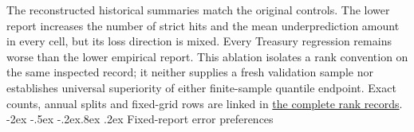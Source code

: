\documentclass[10pt,a4paper]{article}
\makeatletter
\renewcommand\section{\@startsection{section}{1}{\z@}%
  {-2ex \@plus -.5ex \@minus -.2ex}{.8ex \@plus .2ex}%
  {\normalfont\large\bfseries}}
\makeatother
\begin{document}
The reconstructed historical summaries match the original controls.
The lower report increases the number of strict hits and the mean underprediction
amount in every cell, but its loss direction is mixed. Every Treasury regression remains worse
than the lower empirical report. This ablation isolates a rank convention on the same inspected record; it neither supplies a fresh validation sample nor
establishes universal superiority of either finite-sample quantile endpoint.
Exact counts, annual splits and fixed-grid rows are linked in \href{https://github.com/ByronLi0207/financial-mathematics-paper-20261020/blob/revision-v7-final/results/revision-20261022/rank-ablation/README.md}{the complete rank records}.\section{Fixed-report error preferences}\label{sup:preference}
\end{document}

